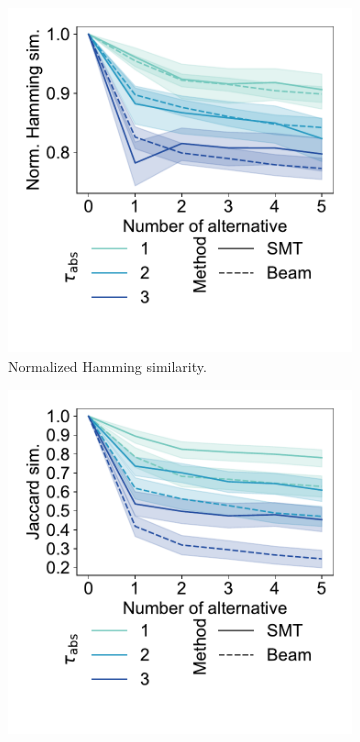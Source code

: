 \documentclass{article}
\theoremstyle{definition}
\begin{document}
\begin{figure}[t]
	\centering
	\begin{subfigure}[t]{0.48\textwidth}
		\centering
		\includegraphics[width=\textwidth, trim=15 50 15 15, clip]{plots/csd-alternatives-hamming.pdf}
		\caption{Normalized Hamming similarity.}
		\label{fig:csd:alternatives-hamming}
	\end{subfigure}
	\hfill
	\begin{subfigure}[t]{0.48\textwidth}
		\centering
		\includegraphics[width=\textwidth, trim=15 50 15 15, clip]{plots/csd-alternatives-jaccard.pdf}

\end{subfigure}
\end{figure}
\end{document}
